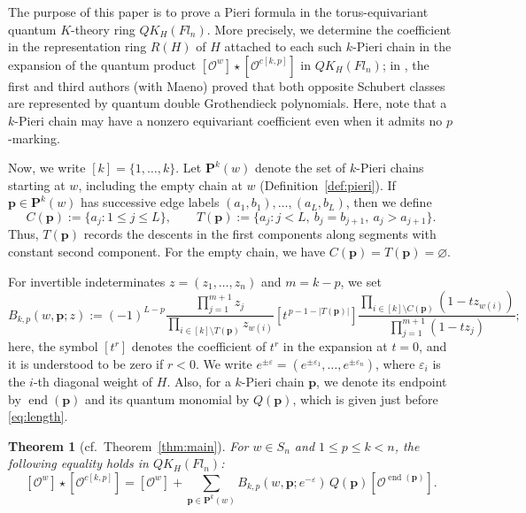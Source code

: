 \documentclass[11pt,a4paper,reqno]{amsart}
\DeclareRobustCommand{\rev}[1]{{\color{revision}#1}}
\numberwithin{equation}{section}
\newtheorem{introthm}{Theorem}
\theoremstyle{definition}
\DeclareMathOperator{\End}{end}
\newcommand{\OO}{\mathcal O}
\newcommand{\Sc}[1]{[\OO^{#1}]}
\newcommand{\Pieri}{\mathbf P}
\newcommand{\pp}{\mathbf p}
\newcommand{\eps}{\varepsilon}
\begin{document}
\rev{The purpose of this paper is to prove a Pieri formula in the torus-equivariant quantum \(K\)-theory ring \(QK_{H}(Fl_n)\). More precisely, we determine the coefficient in the representation ring \(R(H)\) of \(H\) attached to each such \(k\)-Pieri chain in the expansion of the quantum product \(\Sc{w}\star\Sc{c[k,p]}\) in \(QK_H(Fl_n)\); in \cite{MNS1,MNS2}, the first and third authors (with Maeno) proved that both opposite Schubert classes are represented by quantum double Grothendieck polynomials. Here, note that a \(k\)-Pieri chain may have a nonzero equivariant coefficient even when it admits no \(p\)-marking.}

\rev{Now, we write \([k]=\{1,\ldots,k\}\). Let \(\Pieri^k(w)\) denote the set of \(k\)-Pieri chains starting at \(w\), including the empty chain at \(w\) (Definition~\ref{def:pieri}). If \(\pp\in\Pieri^k(w)\) has successive edge labels \((a_1,b_1),\ldots,(a_L,b_L)\), then we define}
\begin{equation}\label{eq:CT}
 C(\pp) :=\{a_j:1\le j\le L\},\qquad
 T(\pp) :=\{a_j:j<L,\ b_j=b_{j+1},\ a_j>a_{j+1}\}.
\end{equation}
\rev{Thus, \(T(\pp)\) records the descents in the first components along segments with constant second component. For the empty chain, we have \(C(\pp)=T(\pp)=\varnothing\).}

\rev{For invertible indeterminates \(z=(z_1,\ldots,z_n)\) and \(m=k-p\), we set}
\begin{equation}\label{eq:coefficient}
 B_{k,p}(w,\pp;z) :=(-1)^{L-p}
 \frac{\prod_{j=1}^{m+1}z_j}{\prod_{i\in[k]\setminus T(\pp)}z_{w(i)}}
 [t^{\,p-1-|T(\pp)|}]
 \frac{\prod_{i\in[k]\setminus C(\pp)}(1-tz_{w(i)})}
      {\prod_{j=1}^{m+1}(1-tz_j)} ;
\end{equation}
\rev{here, the symbol \([t^r]\) denotes the coefficient of \(t^r\) in the expansion at \(t=0\), and it is understood to be zero if \(r<0\). We write \(e^{\pm\eps}=(e^{\pm\eps_1},\ldots,e^{\pm\eps_n})\), where \(\eps_i\) is the \(i\)-th diagonal weight of \(H\). Also, for a \(k\)-Pieri chain \(\pp\), we denote its endpoint by \(\End(\pp)\) and its quantum monomial by \(Q(\pp)\), which is given just before \eqref{eq:length}.}

\begin{introthm}[{cf.\ Theorem~\ref{thm:main}}]\label{thm:intro}
For \(w\in S_n\) and \(1\le p\le k<n\), the following equality holds in \(QK_H(Fl_n)\):
\begin{equation}\label{eq:intro}
 \Sc{w}\star\Sc{c[k,p]}
   =\Sc{w}+\sum_{\pp\in\Pieri^k(w)}
      B_{k,p}(w,\pp;e^{-\eps})\,Q(\pp)\Sc{\End(\pp)} .
\end{equation}
\end{introthm}
\end{document}
